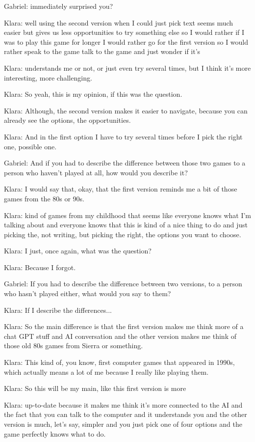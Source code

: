 Gabriel: immediately surprised you?

Klara: well using the second version when I could just pick text seems much easier but gives us less opportunities to try something else so I would rather if I was to play this game for longer I would rather go for the first version so I would rather speak to the game talk to the game and just wonder if it's

Klara: understands me or not, or just even try several times, but I think it's more interesting, more challenging.

Klara: So yeah, this is my opinion, if this was the question.

Klara: Although, the second version makes it easier to navigate, because you can already see the options, the opportunities.

Klara: And in the first option I have to try several times before I pick the right one, possible one.

Gabriel: And if you had to describe the difference between those two games to a person who haven't played at all, how would you describe it?

Klara: I would say that, okay, that the first version reminds me a bit of those games from the 80s or 90s.

Klara: kind of games from my childhood that seems like everyone knows what I'm talking about and everyone knows that this is kind of a nice thing to do and just picking the, not writing, but picking the right, the options you want to choose.

Klara: I just, once again, what was the question?

Klara: Because I forgot.

Gabriel: If you had to describe the difference between two versions, to a person who hasn't played either, what would you say to them?

Klara: If I describe the differences...

Klara: So the main difference is that the first version makes me think more of a chat GPT stuff and AI conversation and the other version makes me think of those old 80s games from Sierra or something.

Klara: This kind of, you know, first computer games that appeared in 1990s, which actually means a lot of me because I really like playing them.

Klara: So this will be my main, like this first version is more

Klara: up-to-date because it makes me think it's more connected to the AI and the fact that you can talk to the computer and it understands you and the other version is much, let's say, simpler and you just pick one of four options and the game perfectly knows what to do.

